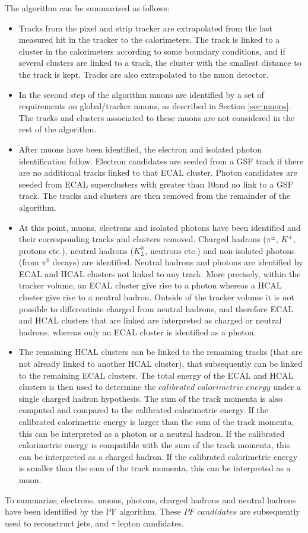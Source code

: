The algorithm can be summarized as follows:
\begin{itemize}
\item Tracks from the pixel and strip tracker are extrapolated from the last measured hit in the tracker to the calorimeters. 
The track is linked to a cluster in the calorimeters according to some boundary conditions, and if several clusters are linked to a track, the cluster with the smallest distance to the track is kept. 
Tracks are also extrapolated to the muon detector. 
\item In the second step of the algorithm muons are identified by a set of requirements on global/tracker muons, as described in Section \ref{sec:muons}. 
The tracks and clusters associated to these muons are not considered in the rest of the algorithm. 
\item After muons have been identified, the electron and isolated photon identification follow. 
Electron candidates are seeded from a GSF track if there are no additional tracks linked to that ECAL cluster. 
Photon candidates are seeded from ECAL superclusters with \ET greater than 10\GeV and no link to a GSF track.
The tracks and clusters are then removed from the remainder of the algorithm. 
\item At this point, muons, electrons and isolated photons have been identified and their corresponding tracks and clusters removed. 
Charged hadrons ($\pi^{\pm}$, $K^{\pm}$, protons etc.), neutral hadrons ($K_{L}^{0}$, neutrons etc.) and non-isolated photons (from $\pi^{0}$ decays) are identified. 
Neutral hadrons and photons are identified by ECAL and HCAL clusters not linked to any track. 
More precisely, within the tracker volume, an ECAL cluster give rise to a photon whereas a HCAL cluster give rise to a neutral hadron. 
Outside of the tracker volume it is not possible to differentiate charged from neutral hadrons, and therefore ECAL and HCAL clusters that are linked are interpreted as charged or neutral hadrons, whereas only an ECAL cluster is identified as a photon. 
\item The remaining HCAL clusters can be linked to the remaining tracks (that are not already linked to another HCAL cluster), that subsequently can be linked to the remaining ECAL clusters. 
The total energy of the ECAL and HCAL clusters is then used to determine the $calibrated$ $calorimetric$ $energy$ under a single charged hadron hypothesis. 
The sum of the track momenta is also computed and compared to the calibrated calorimetric energy. 
If the calibrated calorimetric energy is larger than the sum of the track momenta, this can be interpreted as a photon or a neutral hadron. 
If the calibrated calorimetric energy is compatible with the sum of the track momenta, this can be interpreted as a charged hadron. 
If the calibrated calorimetric energy is smaller than the sum of the track momenta, this can be interpreted as a muon. 
\end{itemize}
To summarize; electrons, muons, photons, charged hadrons and neutral hadrons have been identified by the PF algorithm. 
These $PF$ $candidates$ are subsequently used to reconstruct jets, \ptmiss and $\tau$ lepton candidates.   
